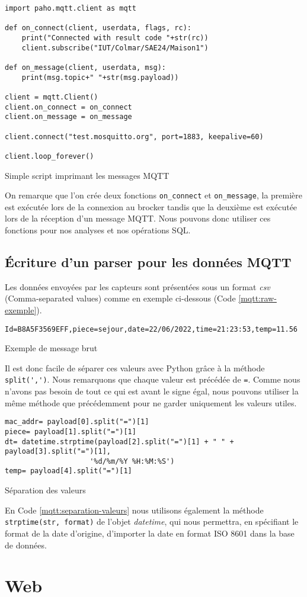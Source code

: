 \documentclass{article}
\begin{document}
    \begin{listing}[H]
        \begin{verbatim}
import paho.mqtt.client as mqtt

def on_connect(client, userdata, flags, rc):
    print("Connected with result code "+str(rc))
    client.subscribe("IUT/Colmar/SAE24/Maison1")

def on_message(client, userdata, msg):
    print(msg.topic+" "+str(msg.payload))

client = mqtt.Client()
client.on_connect = on_connect
client.on_message = on_message

client.connect("test.mosquitto.org", port=1883, keepalive=60)

client.loop_forever()
        \end{verbatim}
        \caption{Simple script imprimant les messages MQTT}
        \label{mqtt:code-exemple}
    \end{listing}
    On remarque que l'on crée deux fonctions \verb|on_connect| et \verb|on_message|, la première est exécutée lors de la connexion au brocker tandis que la deuxième est exécutée lors de la réception d'un message MQTT. 
    Nous pouvons donc utiliser ces fonctions pour nos analyses et nos opérations SQL.

    \subsection{Écriture d'un parser pour les données MQTT}
    Les données envoyées par les capteurs sont présentées sous un format \emph{csv} (Comma-separated values) comme en exemple ci-dessous (Code \ref{mqtt:raw-exemple}). 
    \begin{listing}[H]
        \begin{verbatim}
Id=B8A5F3569EFF,piece=sejour,date=22/06/2022,time=21:23:53,temp=11.56
        \end{verbatim}
        \caption{Exemple de message brut}
        \label{mqtt:raw-exemple}
    \end{listing}
    Il est donc facile de séparer ces valeurs avec Python grâce à la méthode \verb|split(',')|. Nous remarquons que chaque valeur est précédée de \verb|=|. 
    Comme nous n'avons pas besoin de tout ce qui est avant le signe égal, nous pouvons utiliser la même méthode que précédemment pour ne garder uniquement les valeurs utiles.

    \begin{listing}[H]
        \begin{verbatim}
mac_addr= payload[0].split("=")[1]
piece= payload[1].split("=")[1]
dt= datetime.strptime(payload[2].split("=")[1] + " " + payload[3].split("=")[1],
                    '%d/%m/%Y %H:%M:%S')
temp= payload[4].split("=")[1]
        \end{verbatim}
        \caption{Séparation des valeurs}
        \label{mqtt:separation-valeurs}
    \end{listing}
    En Code \ref{mqtt:separation-valeurs} nous utilisons également la méthode \verb|strptime(str, format)| de l'objet \emph{datetime}, qui nous permettra, en spécifiant le format de la date d'origine, d'importer la date en format ISO 8601 dans la base de données.
\newpage
\section{Web}
\label{section:web}
\end{document}
